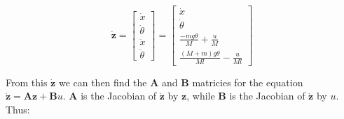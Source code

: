 \documentclass{article}
\begin{document}
\begin{equation}
    \dot{\boldsymbol{z}} = \begin{bmatrix}
        \dot{x} \\
        \dot{\theta} \\
        \ddot{x} \\
        \ddot{\theta}
    \end{bmatrix}
    =
    \begin{bmatrix}
        \dot{x} \\
        \dot{\theta} \\[4pt]
        \frac{-mg\theta}{M}+\frac{u}{M} \\[4pt]
        \frac{(M+m)g\theta}{Ml}-\frac{u}{Ml}
    \end{bmatrix}
\end{equation}

From this $\dot{\boldsymbol{z}}$ we can then find the $\boldsymbol{A}$ and $\boldsymbol{B}$ matricies for the equation $\dot{\boldsymbol{z}}=\boldsymbol{A}\boldsymbol{z}+\boldsymbol{B}u$. $\boldsymbol{A}$ is the Jacobian of $\dot{\boldsymbol{z}}$ by $\boldsymbol{z}$, while $\boldsymbol{B}$ is the Jacobian of $\dot{\boldsymbol{z}}$ by $u$. Thus:
\end{document}
